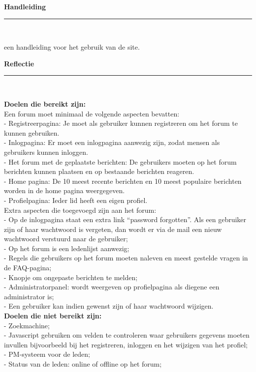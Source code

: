 \documentclass[a4paper,12pt]{article}
\newcommand{\HRule}{\rule{\linewidth}{0.5mm}}
\begin{document}
\newpage
\begin{center}
{ \LARGE \bfseries Handleiding}\\[0.1cm]
\HRule \\[0.5cm]
\end{center}
een handleiding voor het gebruik van de site.


\newpage
\begin{center}
{ \LARGE \bfseries Reflectie}\\[0.1cm]
\HRule \\[0.5cm]
\end{center}
{\bfseries Doelen die bereikt zijn:}\\
Een forum moet minimaal de volgende aspecten bevatten:\\
-	Registreerpagina: 
Je moet als gebruiker kunnen registreren om het forum \hspace{30 cm}te kunnen gebruiken.\\
-	Inlogpagina:
Er moet een inlogpagina aanwezig zijn, zodat mensen als gebruikers kunnen inloggen.\\
-	Het forum met de geplaatste berichten:
De gebruikers moeten op het forum berichten kunnen plaatsen en op bestaande berichten reageren.\\
-	Home pagina:
De 10 meest recente berichten en 10 meest populaire berichten worden in de home pagina weergegeven.\\
-	Profielpagina:
Ieder lid heeft een eigen profiel.\\

Extra aspecten die toegevoegd zijn aan het forum:\\
-	Op de inlogpagina staat een extra link “password forgotten”. Als een gebruiker zijn of haar wachtwoord is vergeten, dan wordt er via de mail een nieuw wachtwoord verstuurd naar de gebruiker;\\
-	Op het forum is een ledenlijst aanwezig;\\
-	Regels die gebruikers op het forum moeten naleven en meest gestelde vragen in de FAQ-pagina;\\
-	Knopje om ongepaste berichten te melden;\\
-	Administratorpanel: wordt weergeven op profielpagina als diegene een administrator is;\\
-	Een gebruiker kan indien gewenst zijn of haar wachtwoord wijzigen.\\

{\bfseries Doelen die niet bereikt zijn:}\\
-	Zoekmachine;\\
-	Javascript gebruiken om velden te controleren waar gebruikers gegevens moeten invullen bijvoorbeeld bij het registreren, inloggen en het wijzigen van het profiel;\\
-	PM-systeem voor de leden;\\
-	Status van de leden: online of offline op het forum;\\
\end{document}
